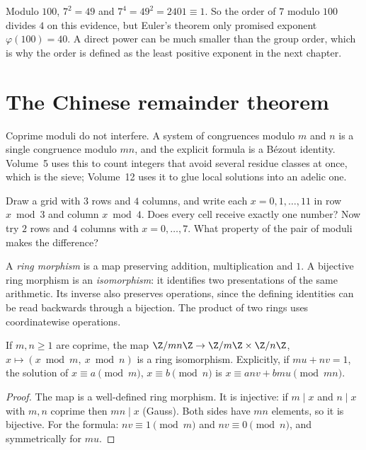 \begin{examplex}
Modulo $100$, $7^2=49$ and $7^4=49^2=2401\equiv 1$. So the order of $7$ modulo $100$ divides $4$ on this evidence, but Euler's theorem only promised exponent $\varphi(100)=40$. A direct power can be much smaller than the group order, which is why the order is defined as the least positive exponent in the next chapter.
\end{examplex}

\section{The Chinese remainder theorem}

Coprime moduli do not interfere. A system of congruences modulo $m$ and $n$ is a single congruence modulo $mn$, and the explicit formula is a Bézout identity. Volume~5 uses this to count integers that avoid several residue classes at once, which is the sieve; Volume~12 uses it to glue local solutions into an adelic one.

\begin{think}
Draw a grid with $3$ rows and $4$ columns, and write each $x=0,1,\dots,11$ in row $x\bmod3$ and column $x\bmod4$. Does every cell receive exactly one number? Now try $2$ rows and $4$ columns with $x=0,\dots,7$. What property of the pair of moduli makes the difference?
\end{think}

A \emph{ring morphism} is a map preserving addition, multiplication and
$1$. A bijective ring morphism is an \emph{isomorphism}: it identifies two
presentations of the same arithmetic. Its inverse also preserves operations,
since the defining identities can be read backwards through a bijection.
The product of two rings uses coordinatewise operations.

\begin{theorem}\label{thm:crt}
If $m,n\ge1$ are coprime, the map $\Z/mn\Z\to\Z/m\Z\times\Z/n\Z$, $x\mapsto(x\bmod m,\ x\bmod n)$ is a ring isomorphism. Explicitly, if $mu+nv=1$, the solution of $x\equiv a\pmod m$, $x\equiv b\pmod n$ is $x\equiv anv+bmu\pmod{mn}$.
\end{theorem}
\begin{proof}
The map is a well-defined ring morphism. It is injective: if $m\mid x$ and $n\mid x$ with $m,n$ coprime then $mn\mid x$ (Gauss). Both sides have $mn$ elements, so it is bijective. For the formula: $nv\equiv1\pmod m$ and $nv\equiv0\pmod n$, and symmetrically for $mu$.
\end{proof}

